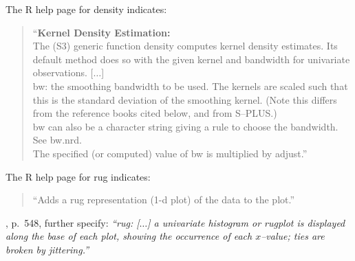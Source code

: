 The R help page for density indicates:
\begin{quotation}
\noindent
``{\bf Kernel Density Estimation:} \\[0.2cm]
The (S3) generic function density computes kernel density estimates. 
Its default method does so with the given kernel and bandwidth for univariate observations. 
[$\ldots$] \\
bw: the smoothing bandwidth to be used. The kernels are scaled such that this is the 
standard deviation of the smoothing kernel. (Note this differs from the reference books 
cited below, and from S--PLUS.) \\
bw can also be a character string giving a rule to choose the bandwidth. See bw.nrd. \\
The specified (or computed) value of bw is multiplied by adjust.''
\end{quotation}


The R help page for rug indicates:
\begin{quotation}
``Adds a rug representation (1-d plot) of the data to the plot.''
\end{quotation}

\cite{CH93}, p.~548, further specify: {\it ``rug: [$\ldots$]
a univariate histogram or rugplot is displayed along the base 
of each plot, showing the occurrence of each $x$--value; ties are
broken by jittering.''}


